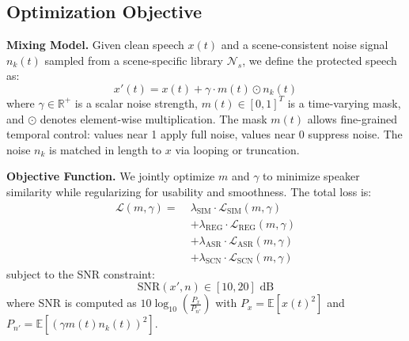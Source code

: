 \subsection{Optimization Objective}

\textbf{Mixing Model.}
Given clean speech $x(t)$ and a scene-consistent noise signal $n_k(t)$ sampled from a scene-specific library $\mathcal{N}_s$, we define the protected speech as:
\begin{equation}
\label{eq:mixing_model}
x'(t) = x(t) + \gamma \cdot m(t) \odot n_k(t)
\end{equation}
where $\gamma \in \mathbb{R}^+$ is a scalar noise strength, $m(t) \in [0,1]^T$ is a time-varying mask, and $\odot$ denotes element-wise multiplication. The mask $m(t)$ allows fine-grained temporal control: values near 1 apply full noise, values near 0 suppress noise. The noise $n_k$ is matched in length to $x$ via looping or truncation.

\textbf{Objective Function.}
We jointly optimize $m$ and $\gamma$ to minimize speaker similarity while regularizing for usability and smoothness. The total loss is:
\begin{equation}
\label{eq:total_loss}
\begin{aligned}
\mathcal{L}(m, \gamma) = \; & \lambda_{\text{SIM}} \cdot \mathcal{L}_{\text{SIM}}(m, \gamma) \\
& + \lambda_{\text{REG}} \cdot \mathcal{L}_{\text{REG}}(m, \gamma) \\
& + \lambda_{\text{ASR}} \cdot \mathcal{L}_{\text{ASR}}(m, \gamma) \\
& + \lambda_{\text{SCN}} \cdot \mathcal{L}_{\text{SCN}}(m, \gamma)
\end{aligned}
\end{equation}
subject to the SNR constraint:
\begin{equation}
\label{eq:snr_constraint}
\text{SNR}(x', n) \in [10, 20] \text{ dB}
\end{equation}
where SNR is computed as $10 \log_{10} \left( \frac{P_x}{P_{n'}} \right)$ with $P_x = \mathbb{E}[x(t)^2]$ and $P_{n'} = \mathbb{E}[(\gamma m(t) n_k(t))^2]$.

